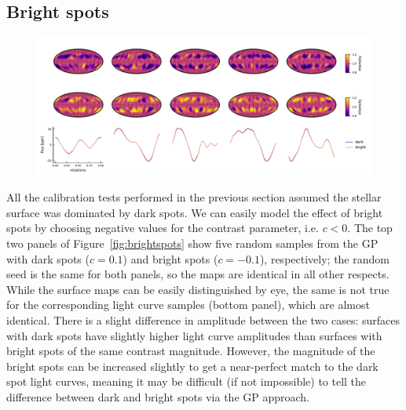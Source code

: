 \documentclass[modern,linenumbers]{aastex62}
\begin{document}
\subsection{Bright spots}
\label{sec:brightspots}

\begin{figure}[t!]
    \begin{centering}
        \includegraphics[width=\linewidth]{figures/brightspots.pdf}
    \end{centering}
\end{figure}

All the calibration tests performed in the previous section assumed the
stellar surface was dominated by dark spots. We can easily model the
effect of bright spots by choosing negative values for the contrast
parameter, i.e. $c < 0$. The top two panels of Figure~\ref{fig:brightspots}
show five random samples from the GP with dark spots ($c = 0.1$) and
bright spots ($c = -0.1$), respectively; the random seed is the same for
both panels, so the maps are identical in all other respects.
While the surface maps can be easily distinguished by eye, the same is not
true for the corresponding light curve samples (bottom panel), which
are almost identical. There is a slight difference in amplitude between
the two cases: surfaces with dark spots have slightly higher light curve
amplitudes than surfaces with bright spots of the same contrast magnitude.
However, the magnitude of the bright spots can be increased slightly to get
a near-perfect match to the dark spot light curves, meaning it may be
difficult (if not impossible) to tell the difference between dark and bright
spots via the GP approach.
\end{document}
